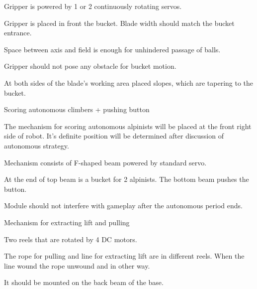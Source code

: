 \begin{enumerate*}
\begin{enumerate*}
  		\item Gripper is powered by 1 or 2 continuously rotating servos.
  		
  		\item Gripper is placed in front the bucket. Blade width should match the bucket entrance.
  		
  		\item Space between axis and field is enough for unhindered passage of balls.
  		
  		\item Gripper should not pose any obstacle for bucket motion.
  		
  		\item At both sides of the blade's working area placed slopes, which are tapering to the bucket.
  	\end{enumerate*}
  	
  	\item Scoring autonomous climbers + pushing button
  	\begin{enumerate*}
  		\item The mechanism for scoring autonomous alpinists will be placed at the front right side of robot. It's definite position will be determined after discussion of autonomous strategy.
  		
  		\item Mechanism consists of F-shaped beam powered by standard servo.
  		
  		\item At the end of top beam is a bucket for 2 alpinists. The bottom beam pushes the button.
  		
  		\item Module should not interfere with gameplay after the autonomous period ends.
  	\end{enumerate*}
  	
  	\item Mechanism for extracting lift and pulling
  	
  	\begin{enumerate*}
  		\item Two reels that are rotated by 4 DC motors.
  		
  		\item The rope for pulling and line for extracting lift are in different reels. When the line wound the rope unwound and in other way.
  		
  		\item It should be mounted on the back beam of the base.
  		
  	\end{enumerate*}
  	
  \end{enumerate*}
  
